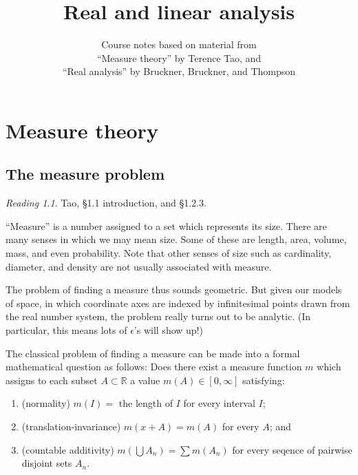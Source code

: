 \documentclass[11pt,oneside]{amsbook}
\title{Real and linear analysis}
\author{Course notes based on material from\\``Measure theory'' by Terence Tao, and\\``Real analysis'' by Bruckner, Bruckner, and Thompson}
\newcommand{\RR}{{\mathbb R}}
\theoremstyle{definition}
\theoremstyle{plain}
\theoremstyle{definition}
\theoremstyle{remark}
\newtheorem*{reading}{Reading}
\numberwithin{equation}{section}
\numberwithin{figure}{section}
\begin{document}
\maketitle

\tableofcontents

\chapter{Measure theory}

\section{The measure problem}

\begin{reading}
  Tao, \S1.1 introduction, and \S1.2.3.
\end{reading}

``Measure'' is a number assigned to a set which represents its size. There are many senses in which we may mean size. Some of these are length, area, volume, mass, and even probability. Note that other senses of size such as cardinality, diameter, and density are not usually associated with measure.

The problem of finding a measure thus sounds geometric. But given our models of space, in which coordinate axes are indexed by infinitesimal points drawn from the real number system, the problem really turns out to be analytic. (In particular, this means lots of $\epsilon$'s will show up!)

The classical problem of finding a measure can be made into a formal mathematical question as follows: Does there exist a measure function $m$ which assigns to each subset $A\subset\RR$ a value $m(A)\in[0,\infty]$ satisfying:
\begin{enumerate}
\item (normality) $m(I)=$ the length of $I$ for every interval $I$;
\item (translation-invariance) $m(x+A)=m(A)$ for every $A$; and
\item (countable additivity) $m(\bigcup A_n)=\sum m(A_n)$ for every seqence of pairwise disjoint sets $A_n$.
\end{enumerate}
\end{document}
